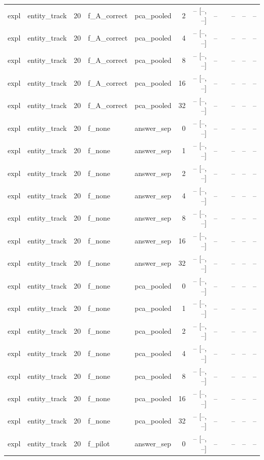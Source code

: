 \begin{tabular}{llrllrrrlrrr}
expl & entity\_track & 20 & f\_A\_correct & pca\_pooled & 2 & -- [--, --] & -- &  & -- & -- & -- \\
expl & entity\_track & 20 & f\_A\_correct & pca\_pooled & 4 & -- [--, --] & -- &  & -- & -- & -- \\
expl & entity\_track & 20 & f\_A\_correct & pca\_pooled & 8 & -- [--, --] & -- &  & -- & -- & -- \\
expl & entity\_track & 20 & f\_A\_correct & pca\_pooled & 16 & -- [--, --] & -- &  & -- & -- & -- \\
expl & entity\_track & 20 & f\_A\_correct & pca\_pooled & 32 & -- [--, --] & -- &  & -- & -- & -- \\
expl & entity\_track & 20 & f\_none & answer\_sep & 0 & -- [--, --] & -- &  & -- & -- & -- \\
expl & entity\_track & 20 & f\_none & answer\_sep & 1 & -- [--, --] & -- &  & -- & -- & -- \\
expl & entity\_track & 20 & f\_none & answer\_sep & 2 & -- [--, --] & -- &  & -- & -- & -- \\
expl & entity\_track & 20 & f\_none & answer\_sep & 4 & -- [--, --] & -- &  & -- & -- & -- \\
expl & entity\_track & 20 & f\_none & answer\_sep & 8 & -- [--, --] & -- &  & -- & -- & -- \\
expl & entity\_track & 20 & f\_none & answer\_sep & 16 & -- [--, --] & -- &  & -- & -- & -- \\
expl & entity\_track & 20 & f\_none & answer\_sep & 32 & -- [--, --] & -- &  & -- & -- & -- \\
expl & entity\_track & 20 & f\_none & pca\_pooled & 0 & -- [--, --] & -- &  & -- & -- & -- \\
expl & entity\_track & 20 & f\_none & pca\_pooled & 1 & -- [--, --] & -- &  & -- & -- & -- \\
expl & entity\_track & 20 & f\_none & pca\_pooled & 2 & -- [--, --] & -- &  & -- & -- & -- \\
expl & entity\_track & 20 & f\_none & pca\_pooled & 4 & -- [--, --] & -- &  & -- & -- & -- \\
expl & entity\_track & 20 & f\_none & pca\_pooled & 8 & -- [--, --] & -- &  & -- & -- & -- \\
expl & entity\_track & 20 & f\_none & pca\_pooled & 16 & -- [--, --] & -- &  & -- & -- & -- \\
expl & entity\_track & 20 & f\_none & pca\_pooled & 32 & -- [--, --] & -- &  & -- & -- & -- \\
expl & entity\_track & 20 & f\_pilot & answer\_sep & 0 & -- [--, --] & -- &  & -- & -- & -- \\

\end{tabular}
